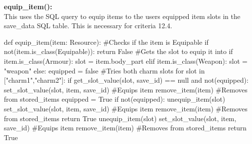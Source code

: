 \documentclass{article}
\begin{document}
        \textbf{equip\_item():}\\
        This uses the SQL query to equip items to the users equipped item slots in the save\_data SQL table. This is necessary for criteria 12.4.\\
        \begin{python}
def equip_item(item: Resource):
        #Checks if the item is Equipable
        if not(item.is_class(Equipable)):
                return False
        #Gets the slot to equip it into
        if item.is_class(Armour):
                slot = item.body_part
        elif item.is_class(Weapon):
                slot = "weapon"
        else:
                equipped = false
                #Tries both charm slots
                for slot in ["charm1","charm2"]:
                        if get_slot_value(slot, save_id) == null and not(equipped):
                                set_slot_value(slot, item, save_id) #Equips item
                                remove_item(item) #Removes from stored_items
                                equipped = True
                if not(equipped):
                        unequip_item(slot)
                        set_slot_value(slot, item, save_id) #Equips item
                        remove_item(item) #Removes from stored_items
                return True
        unequip_item(slot)
        set_slot_value(slot, item, save_id) #Equips item
        remove_item(item) #Removes from stored_items
        return True     
        \end{python}
\end{document}
